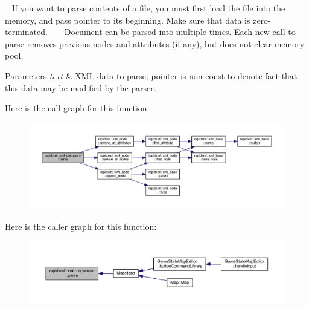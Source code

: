 ~\newline
 If you want to parse contents of a file, you must first load the file into the memory, and pass pointer to its beginning. Make sure that data is zero-\/terminated. ~\newline
~\newline
 Document can be parsed into multiple times. Each new call to parse removes previous nodes and attributes (if any), but does not clear memory pool. 
\begin{DoxyParams}{Parameters}
{\em text} & X\+M\+L data to parse; pointer is non-\/const to denote fact that this data may be modified by the parser. \\
\hline
\end{DoxyParams}


Here is the call graph for this function\+:
\nopagebreak
\begin{figure}[H]
\begin{center}
\leavevmode
\includegraphics[width=350pt]{singletonrapidxml_1_1xml__document_ac6e73ff9ac323bf5a370c38feb03a6b1_cgraph}
\end{center}
\end{figure}




Here is the caller graph for this function\+:
\nopagebreak
\begin{figure}[H]
\begin{center}
\leavevmode
\includegraphics[width=350pt]{singletonrapidxml_1_1xml__document_ac6e73ff9ac323bf5a370c38feb03a6b1_icgraph}
\end{center}
\end{figure}


